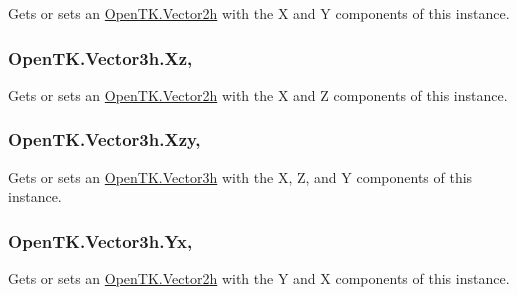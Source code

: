 Gets or sets an \hyperlink{struct_open_t_k_1_1_vector2h}{Open\-T\-K.\-Vector2h} with the X and Y components of this instance. 

\hypertarget{struct_open_t_k_1_1_vector3h_a538424451d707bbfd01795f619e4dd29}{
\subsubsection[{Xz}]{ Open\-T\-K.\-Vector3h.\-Xz\hspace{0.3cm}{\ttfamily [get]}, {\ttfamily [set]}}}\label{struct_open_t_k_1_1_vector3h_a538424451d707bbfd01795f619e4dd29}


Gets or sets an \hyperlink{struct_open_t_k_1_1_vector2h}{Open\-T\-K.\-Vector2h} with the X and Z components of this instance. 

\hypertarget{struct_open_t_k_1_1_vector3h_a2d741bbec8beb698f01ae815801937ee}{
\subsubsection[{Xzy}]{ Open\-T\-K.\-Vector3h.\-Xzy\hspace{0.3cm}{\ttfamily [get]}, {\ttfamily [set]}}}\label{struct_open_t_k_1_1_vector3h_a2d741bbec8beb698f01ae815801937ee}


Gets or sets an \hyperlink{struct_open_t_k_1_1_vector3h}{Open\-T\-K.\-Vector3h} with the X, Z, and Y components of this instance. 

\hypertarget{struct_open_t_k_1_1_vector3h_a0f7c7bda0a60e484981c1089fdce1204}{
\subsubsection[{Yx}]{ Open\-T\-K.\-Vector3h.\-Yx\hspace{0.3cm}{\ttfamily [get]}, {\ttfamily [set]}}}\label{struct_open_t_k_1_1_vector3h_a0f7c7bda0a60e484981c1089fdce1204}


Gets or sets an \hyperlink{struct_open_t_k_1_1_vector2h}{Open\-T\-K.\-Vector2h} with the Y and X components of this instance. 

